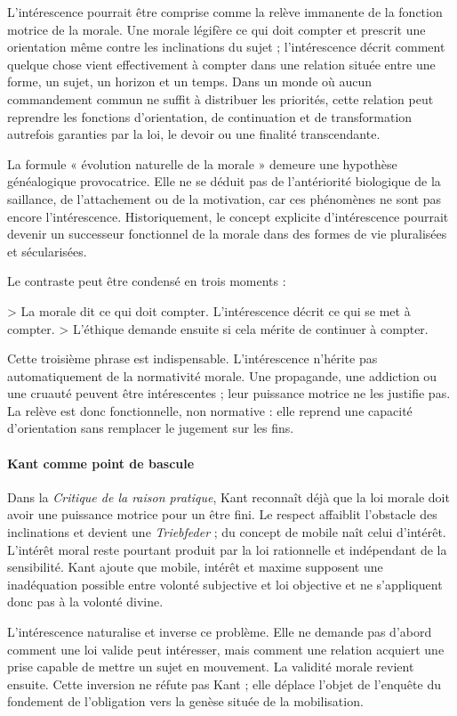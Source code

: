 \documentclass[10pt,a4paper]{article}
\begin{document}
L'intérescence pourrait être comprise comme la relève immanente de la fonction motrice de la morale. Une morale légifère ce qui doit compter et prescrit une orientation même contre les inclinations du sujet ; l'intérescence décrit comment quelque chose vient effectivement à compter dans une relation située entre une forme, un sujet, un horizon et un temps. Dans un monde où aucun commandement commun ne suffit à distribuer les priorités, cette relation peut reprendre les fonctions d'orientation, de continuation et de transformation autrefois garanties par la loi, le devoir ou une finalité transcendante.

La formule « évolution naturelle de la morale » demeure une hypothèse généalogique provocatrice. Elle ne se déduit pas de l'antériorité biologique de la saillance, de l'attachement ou de la motivation, car ces phénomènes ne sont pas encore l'intérescence. Historiquement, le concept explicite d'intérescence pourrait devenir un successeur fonctionnel de la morale dans des formes de vie pluralisées et sécularisées.

Le contraste peut être condensé en trois moments :

> La morale dit ce qui doit compter. L'intérescence décrit ce qui se met à compter. > L'éthique demande ensuite si cela mérite de continuer à compter.

Cette troisième phrase est indispensable. L'intérescence n'hérite pas automatiquement de la normativité morale. Une propagande, une addiction ou une cruauté peuvent être intérescentes ; leur puissance motrice ne les justifie pas. La relève est donc fonctionnelle, non normative : elle reprend une capacité d'orientation sans remplacer le jugement sur les fins.

\paragraph{Kant comme point de bascule}
Dans la \emph{Critique de la raison pratique}, Kant reconnaît déjà que la loi morale doit avoir une puissance motrice pour un être fini. Le respect affaiblit l'obstacle des inclinations et devient une \emph{Triebfeder} ; du concept de mobile naît celui d'intérêt. L'intérêt moral reste pourtant produit par la loi rationnelle et indépendant de la sensibilité. Kant ajoute que mobile, intérêt et maxime supposent une inadéquation possible entre volonté subjective et loi objective et ne s'appliquent donc pas à la volonté divine.

L'intérescence naturalise et inverse ce problème. Elle ne demande pas d'abord comment une loi valide peut intéresser, mais comment une relation acquiert une prise capable de mettre un sujet en mouvement. La validité morale revient ensuite. Cette inversion ne réfute pas Kant ; elle déplace l'objet de l'enquête du fondement de l'obligation vers la genèse située de la mobilisation.
\end{document}
